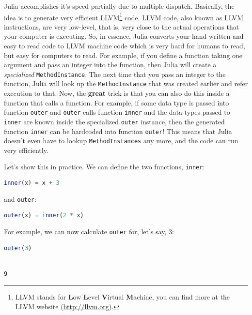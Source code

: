 \documentclass[
  notoc %
]{tufte-book}
\newcommand{\passthrough}[1]{#1}
\begin{document}
Julia accomplishes it's speed partially due to multiple dispatch.
Basically, the idea is to generate very efficient LLVM\footnote{LLVM
  stands for \textbf{L}ow \textbf{L}evel \textbf{V}irtual
  \textbf{M}achine, you can find more at the LLVM website
  (\url{http://llvm.org}).} code. LLVM code, also known as LLVM
instructions, are very low-level, that is, very close to the actual
operations that your computer is executing. So, in essence, Julia
converts your hand written and easy to read code to LLVM machine code
which is very hard for humans to read, but easy for computers to read.
For example, if you define a function taking one argument and pass an
integer into the function, then Julia will create a \emph{specialized}
\passthrough{\lstinline!MethodInstance!}. The next time that you pass an
integer to the function, Julia will look up the
\passthrough{\lstinline!MethodInstance!} that was created earlier and
refer execution to that. Now, the \textbf{great} trick is that you can
also do this inside a function that calls a function. For example, if
some data type is passed into function \passthrough{\lstinline!outer!}
and \passthrough{\lstinline!outer!} calls function
\passthrough{\lstinline!inner!} and the data types passed to
\passthrough{\lstinline!inner!} are known inside the specialized
\passthrough{\lstinline!outer!} instance, then the generated function
\passthrough{\lstinline!inner!} can be hardcoded into function
\passthrough{\lstinline!outer!}! This means that Julia doesn't even have
to lookup \passthrough{\lstinline!MethodInstances!} any more, and the
code can run very efficiently.

Let's show this in practice. We can define the two functions,
\passthrough{\lstinline!inner!}:

\begin{lstlisting}[language=Julia]
inner(x) = x + 3
\end{lstlisting}

and \passthrough{\lstinline!outer!}:

\begin{lstlisting}[language=Julia]
outer(x) = inner(2 * x)
\end{lstlisting}

For example, we can now calculate \passthrough{\lstinline!outer!} for,
let's say, 3:

\begin{lstlisting}[language=Julia]
outer(3)
\end{lstlisting}

\begin{lstlisting}[language=Output]

9

\end{lstlisting}
\end{document}
